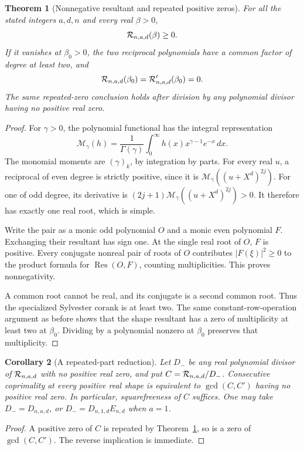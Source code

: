 \documentclass[11pt]{article}
\newtheorem{theorem}{Theorem}
\newtheorem{corollary}[theorem]{Corollary}
\newcommand{\Res}{\operatorname{Res}}
\begin{document}
\begin{theorem}[Nonnegative resultant and repeated positive zeros]
\label{thm:nonnegative}
For all the stated integers $a,d,n$ and every real $\beta>0$,
\[
 {\cal R}_{n,a,d}(\beta)\ge0.
\]
If it vanishes at $\beta_0>0$, the two reciprocal polynomials have
a common factor of degree at least two, and
\[
 {\cal R}_{n,a,d}(\beta_0)
 ={\cal R}_{n,a,d}'(\beta_0)=0.
\]
The same repeated-zero conclusion holds after division by any polynomial
divisor having no positive real zero.
\end{theorem}
\begin{proof}
For $\gamma>0$, the polynomial functional has the integral representation
\[
 \mathcal M_\gamma(h)
 =\frac{1}{\Gamma(\gamma)}
   \int_0^\infty h(x)x^{\gamma-1}e^{-x}\,dx .
\]
The monomial moments are $(\gamma)_k$, by integration by parts.
For every real $u$, a reciprocal of even degree is strictly positive,
since it is $\mathcal M_\gamma((u+X^d)^{2j})$.
For one of odd degree, its derivative is
$(2j+1)\mathcal M_\gamma((u+X^d)^{2j})>0$.
It therefore has exactly one real root, which is simple.

Write the pair as a monic odd polynomial $O$ and a monic even
polynomial $F$. Exchanging their resultant has sign one.
At the single real root of $O$, $F$ is positive.
Every conjugate nonreal pair of roots of $O$ contributes
$|F(\xi)|^2\ge0$ to the product formula for $\Res(O,F)$, counting
multiplicities. This proves nonnegativity.

A common root cannot be real, and its conjugate is a second common
root. Thus the specialized Sylvester corank is at least two.
The same constant-row-operation argument as before shows that the
shape resultant has a zero of multiplicity at least two at $\beta_0$.
Dividing by a polynomial nonzero at $\beta_0$ preserves that multiplicity.
\end{proof}

\begin{corollary}[A repeated-part reduction]\label{cor:repeated-part}
Let $D_-$ be any real polynomial divisor of $ {\cal R}_{n,a,d}$ with
no positive real zero, and put $C={\cal R}_{n,a,d}/D_-$.
Consecutive coprimality at every positive real shape is equivalent
to $\gcd(C,C')$ having no positive real zero.
In particular, squarefreeness of $C$ suffices.
One may take $D_-=D_{n,a,d}$, or $D_-=D_{n,1,d}E_{n,d}$ when $a=1$.
\end{corollary}
\begin{proof}
A positive zero of $C$ is repeated by Theorem~\ref{thm:nonnegative},
so is a zero of $\gcd(C,C')$. The reverse implication is immediate.
\end{proof}
\end{document}
